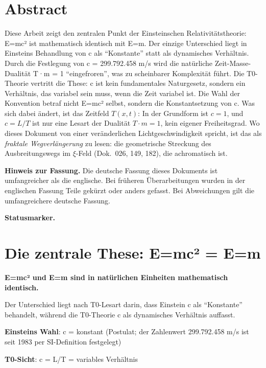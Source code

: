 \section*{Abstract}
		Diese Arbeit zeigt den zentralen Punkt der Einsteinschen Relativitätstheorie: E=mc² ist mathematisch identisch mit E=m. Der einzige Unterschied liegt in Einsteins Behandlung von c als ``Konstante'' statt als dynamisches Verhältnis. Durch die Festlegung von c = 299.792.458 m/s wird die natürliche Zeit-Masse-Dualität T·m = 1 ``eingefroren'', was zu scheinbarer Komplexität führt. Die T0-Theorie vertritt die These: c ist kein fundamentales Naturgesetz, sondern ein Verhältnis, das variabel sein muss, wenn die Zeit variabel ist. Die Wahl der Konvention betraf nicht E=mc² selbst, sondern die Konstantsetzung von c. Was sich dabei ändert, ist das Zeitfeld $T(x,t)$: In der Grundform ist $c = 1$, und $c = L/T$ ist nur eine Lesart der Dualität $T\cdot m = 1$, kein eigener Freiheitsgrad. Wo dieses Dokument von einer veränderlichen Lichtgeschwindigkeit spricht, ist das als \emph{fraktale Wegverlängerung} zu lesen: die geometrische Streckung des Ausbreitungswegs im $\xi$-Feld (Dok.~026, 149, 182), die achromatisch ist.

	\medskip\noindent\textbf{Hinweis zur Fassung.} Die deutsche Fassung dieses Dokuments ist umfangreicher als die englische. Bei früheren Überarbeitungen wurden in der englischen Fassung Teile gekürzt oder anders gefasst. Bei Abweichungen gilt die umfangreichere deutsche Fassung.

	\medskip\noindent\textbf{Statusmarker.}
	

	
	
	
	\section{Die zentrale These: E=mc² = E=m}
	
	\begin{tcolorbox}[colback=red!5!white,colframe=red!75!black,title=Die zentrale These]
		\textbf{E=mc² und E=m sind in natürlichen Einheiten mathematisch identisch.}
		
		Der Unterschied liegt nach T0-Lesart darin, dass Einstein c als ``Konstante'' behandelt, während die T0-Theorie c als dynamisches Verhältnis auffasst.
		
		\textbf{Einsteins Wahl}: c = konstant (Postulat; der Zahlenwert 299.792.458 m/s ist seit 1983 per SI-Definition festgelegt)
		
		\textbf{T0-Sicht}: c = L/T = variables Verhältnis
	\end{tcolorbox}
	

